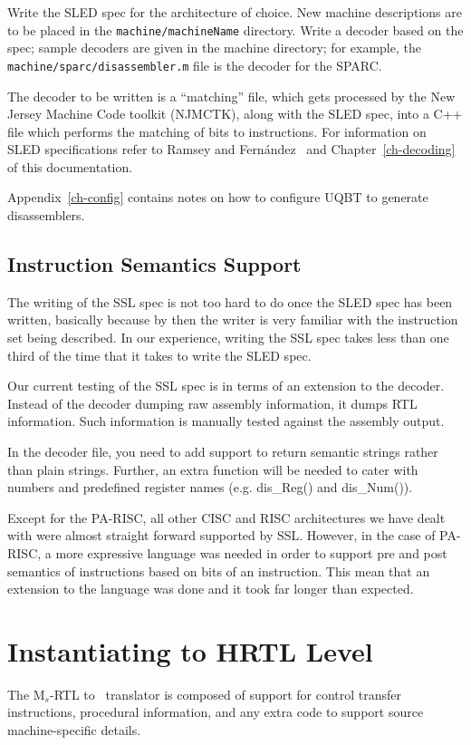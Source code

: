 Write the SLED spec for the architecture of choice.  
New machine descriptions are to be placed in the 
\texttt{machine/machineName} directory. 
Write a decoder based on the spec; sample decoders are given 
in the machine directory; for example, the 
\texttt{machine/sparc/disassembler.m} 
file is the decoder for the SPARC. 

The decoder to be written is a ``matching'' file, which gets 
processed by the New Jersey Machine Code toolkit (NJMCTK), along
with the SLED spec, into a C++ file which performs the matching
of bits to instructions.  
For information on SLED specifications refer to Ramsey and 
Fern\'{a}ndez~\cite{Rams97} and Chapter~\ref{ch-decoding} of 
this documentation.  

Appendix~\ref{ch-config} contains notes on how to configure
UQBT to generate disassemblers. 


\subsection{Instruction Semantics Support}
	The writing of the SSL spec is not too hard to do once the 
	SLED spec has been written, basically because by then the 
	writer is very familiar with the instruction set being 
	described.  In our experience, writing the SSL spec takes 
	less than one third of the time that it takes to write the
	SLED spec.  

	Our current testing of the SSL spec is in terms of an extension
	to the decoder.  Instead of the decoder dumping raw assembly 
	information, it dumps RTL information.  Such information is 
	manually tested against the assembly output. 

In the decoder file, you need to add support to return semantic
strings rather than plain strings.  Further, an extra function 
will be needed to cater with numbers and predefined register 
names (e.g. dis\_Reg() and dis\_Num()). 

Except for the PA-RISC, all other CISC and RISC architectures we have 
dealt with were almost straight forward supported by SSL.  However, 
in the case of PA-RISC, a more expressive language was needed in order 
to support pre and post semantics of instructions based on bits of 
an instruction.  This mean that an extension to the language was 
done and it took far longer than expected.   


\section{Instantiating to HRTL Level}
The M$_s$-RTL to \hrtl\ translator is composed of support for 
control transfer instructions, procedural information, and 
any extra code to support source machine-specific details. 

